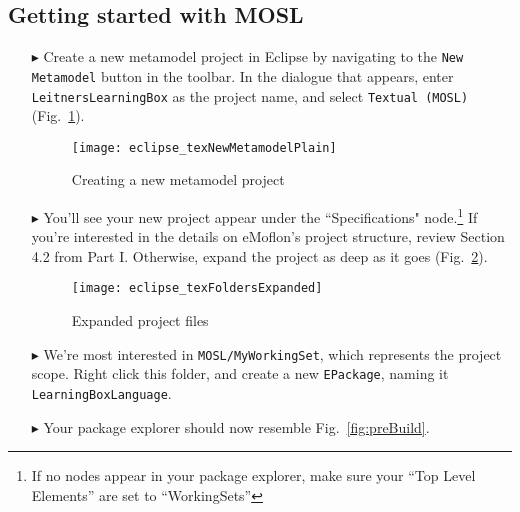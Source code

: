 \clearpage
\subsection{Getting started with MOSL}
\texHeader
\hypertarget{static tex}{} 

\begin{itemize}
\item[$\blacktriangleright$] Create a new metamodel project in Eclipse by navigating to the \texttt{New Metamodel} button in the toolbar. In the dialogue that
appears, enter \texttt{LeitnersLearningBox} as the project name, and select \texttt{Textual (MOSL)}  (Fig.~\ref{fig:new_project}).

\vspace{0.5cm}

\begin{figure}[htbp]
	\centering
  \texttt{[image: eclipse\_texNewMetamodelPlain]}
	\caption{Creating a new metamodel project}
	\label{fig:new_project}
\end{figure}

\vspace{0.5cm}

\item[$\blacktriangleright$] You'll see your new project appear under the ``Specifications" node.\footnote{If no nodes appear in your package explorer,
make sure your ``Top Level Elements'' are set to ``WorkingSets''} If you're interested in the details on eMoflon's project structure, review Section 4.2 from
Part I. Otherwise, expand the project as deep as it goes (Fig.~\ref{fig:expanded_folders}).

\clearpage

\begin{figure}[htbp]
	\centering
  \texttt{[image: eclipse\_texFoldersExpanded]}
	\caption{Expanded project files}
	\label{fig:expanded_folders}
\end{figure} 

\vspace{0.25cm}

\item[$\blacktriangleright$] We're most interested in \texttt{MOSL/MyWorkingSet}, which represents the project scope. Right click this folder, and create a new
\texttt{EPackage}, naming it \texttt{LearningBoxLanguage}.

\item[$\blacktriangleright$] Your package explorer should now resemble Fig.~\ref{fig:preBuild}.


\end{itemize}
